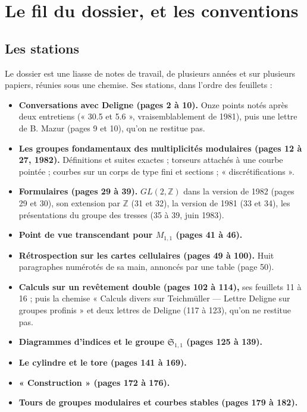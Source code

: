 \documentclass[11pt,a4paper]{article}
\begin{document}
\section*{Le fil du dossier, et les conventions}

\subsection*{Les stations}

Le dossier est une liasse de notes de travail,
de plusieurs années et sur plusieurs papiers, réunies sous une chemise. Ses
stations, dans l'ordre des feuillets :

\begin{itemize}
\item \textbf{Conversations avec Deligne (pages 2 à 10).} Onze points notés
après deux entretiens (« 30.5 et 5.6 », vraisemblablement de 1981), puis une
lettre de B. Mazur (pages 9 et 10), qu'on ne restitue pas.
\item \textbf{Les groupes fondamentaux des multiplicités modulaires (pages 12
à 27, 1982).} Définitions et suites exactes ; torseurs attachés à une courbe
pointée ; courbes sur un corps de type fini et sections ; « discrétifications ».
\item \textbf{Formulaires (pages 29 à 39).} $GL(2, \mathbb{Z})$ dans la
version de 1982 (pages 29 et 30), son extension par $\mathbb{Z}$ (31 et 32),
la version de 1981 (33 et 34), les présentations du groupe des tresses
(35 à 39, juin 1983).
\item \textbf{Point de vue transcendant pour $M_{1,1}$ (pages 41 à 46).}
\item \textbf{Rétrospection sur les cartes cellulaires (pages 49 à 100).}
Huit paragraphes numérotés de sa main, annoncés par une table (page 50).
\item \textbf{Calculs sur un revêtement double (pages 102 à 114),} ses
feuillets 11 à 16 ; puis la chemise « Calculs divers sur Teichmüller — Lettre
Deligne sur groupes profinis » et deux lettres de Deligne (117 à 123), qu'on
ne restitue pas.
\item \textbf{Diagrammes d'indices et le groupe $\mathfrak{S}_{1,1}$ (pages 125
à 139).}
\item \textbf{Le cylindre et le tore (pages 141 à 169).}
\item \textbf{« Construction » (pages 172 à 176).}
\item \textbf{Tours de groupes modulaires et courbes stables (pages 179 à
182).}
\end{itemize}
\end{document}
